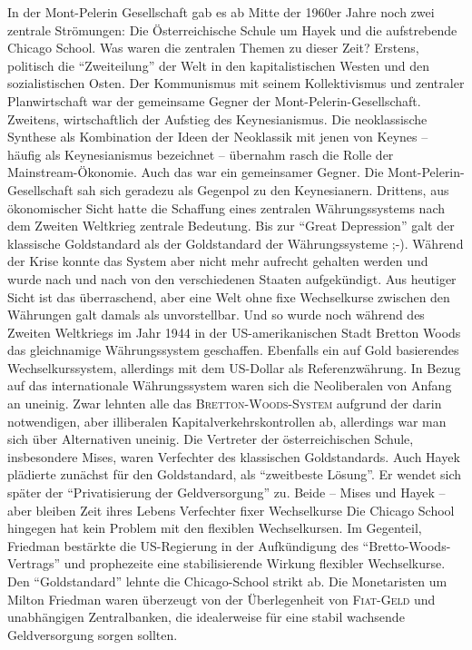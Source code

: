 In der Mont-Pelerin Gesellschaft gab es ab Mitte der 1960er Jahre noch zwei zentrale Strömungen: Die Österreichische Schule um Hayek und die aufstrebende Chicago School. Was waren die zentralen Themen zu dieser Zeit? Erstens, politisch die "`Zweiteilung"' der Welt in den kapitalistischen Westen und den sozialistischen Osten. Der Kommunismus mit seinem Kollektivismus und zentraler Planwirtschaft war der gemeinsame Gegner der Mont-Pelerin-Gesellschaft. Zweitens, wirtschaftlich der Aufstieg des Keynesianismus. Die neoklassische Synthese als Kombination der Ideen der Neoklassik mit jenen von Keynes -- häufig als Keynesianismus bezeichnet -- übernahm rasch die Rolle der Mainstream-Ökonomie. Auch das war ein gemeinsamer Gegner. Die Mont-Pelerin-Gesellschaft sah sich geradezu als Gegenpol zu den Keynesianern. Drittens, aus ökonomischer Sicht hatte die Schaffung eines zentralen Währungssystems nach dem Zweiten Weltkrieg zentrale Bedeutung. Bis zur "`Great Depression"' galt der klassische Goldstandard als der Goldstandard der Währungssysteme ;-). Während der Krise konnte das System aber nicht mehr aufrecht gehalten werden und wurde nach und nach von den verschiedenen Staaten aufgekündigt. Aus heutiger Sicht ist das überraschend, aber eine Welt ohne fixe Wechselkurse zwischen den Währungen galt damals als unvorstellbar. Und so wurde noch während des Zweiten Weltkriegs im Jahr 1944 in der US-amerikanischen Stadt Bretton Woods das gleichnamige Währungssystem geschaffen. Ebenfalls ein auf Gold basierendes Wechselkurssystem, allerdings mit dem US-Dollar als Referenzwährung. In Bezug auf das internationale Währungssystem waren sich die Neoliberalen von Anfang an uneinig. Zwar lehnten alle das \textsc{Bretton-Woods-System} aufgrund der darin notwendigen, aber illiberalen Kapitalverkehrskontrollen ab, allerdings war man sich über Alternativen uneinig.
Die Vertreter der österreichischen Schule, insbesondere Mises, waren Verfechter des klassischen Goldstandards. Auch Hayek plädierte zunächst für den Goldstandard, als "`zweitbeste Lösung"'. Er wendet sich später der "`Privatisierung der Geldversorgung"' zu. Beide -- Mises und Hayek -- aber bleiben Zeit ihres Lebens Verfechter fixer Wechselkurse \parencite[S. 256]{Kolev2017} Die Chicago School hingegen hat kein Problem mit den flexiblen Wechselkursen. Im Gegenteil, Friedman bestärkte die US-Regierung in der Aufkündigung des "`Bretto-Woods-Vertrags"' und prophezeite eine stabilisierende Wirkung flexibler Wechselkurse. Den "`Goldstandard"' lehnte die Chicago-School strikt ab. Die Monetaristen um Milton Friedman waren überzeugt von der Überlegenheit von \textsc{Fiat-Geld} und unabhängigen Zentralbanken, die idealerweise für eine stabil wachsende Geldversorgung sorgen sollten.
